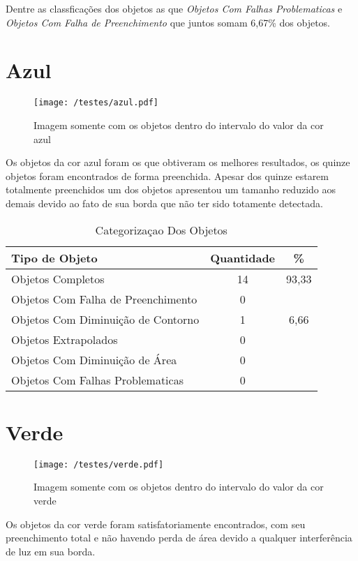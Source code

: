 Dentre as classficações dos objetos as que  \textit{Objetos Com Falhas Problematicas} e \textit{Objetos Com Falha de Preenchimento} que juntos somam 6,67\% dos objetos.

\section{Azul}
	\begin{figure}[H]
		\centering
		\texttt{[image: /testes/azul.pdf]}
		\caption{Imagem somente com os objetos dentro do intervalo do valor da cor azul}
		\label{disposicaoparte}
	\end{figure}

Os objetos da cor azul foram os que obtiveram os melhores resultados, os quinze objetos foram encontrados de forma preenchida.	Apesar dos quinze estarem totalmente preenchidos um dos objetos apresentou um tamanho reduzido aos demais devido ao fato de sua borda que não ter sido totamente detectada.

\begin{table}[h]
\centering
\begin{tabular}{l|c|c}
Tipo de Objeto & Quantidade & \% \\ %
\hline                               %
Objetos Completos & 14 & 93,33 \\
\hline 
Objetos Com Falha de Preenchimento & 0\\
\hline 
Objetos Com Diminuição de Contorno &  1 & 6,66
\\
\hline 
Objetos Extrapolados &  0\\
\hline 
Objetos Com Diminuição de Área & 0 \\
\hline 
Objetos Com Falhas Problematicas & 0 \\
\hline 
\end{tabular}
\caption{Categorizaçao Dos Objetos}
\end{table}

\section{Verde}
	\begin{figure}[H]
		\centering
		\texttt{[image: /testes/verde.pdf]}
		\caption{Imagem somente com os objetos dentro do intervalo do valor da cor verde}
		\label{disposicaoparte}
	\end{figure}

Os objetos da cor verde foram satisfatoriamente encontrados, com seu preenchimento total e não havendo perda de área devido a qualquer interferência de luz em sua borda.	
	
